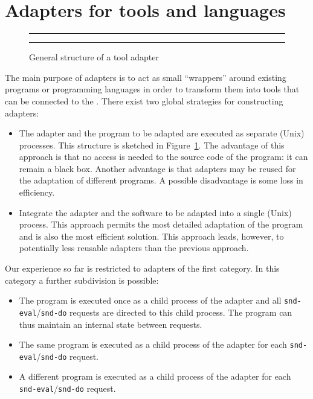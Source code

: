\documentclass[a4,twoside,noweb]{article} %
\begin{document}
\section{\label{Adapters}Adapters for tools and languages}
\begin{figure}[tb]
\rule{\textwidth}{0.5mm}
  
  \centerline{\box\graph}
  \caption{General structure of a tool adapter}
  \label{fig:adapter}
\rule{\textwidth}{0.5mm}
\end{figure}

The main purpose of adapters is to act as small ``wrappers'' around existing
programs or programming languages in order to transform them into tools that
can be connected to the \TB. There exist two global strategies for
constructing adapters:

\begin{itemize}
\item The adapter and the program to be adapted are executed as separate
(Unix) processes. This structure is sketched in Figure~\ref{fig:adapter}.
The advantage of this approach is that no access is
needed to the source code of the program: it can remain a black box.
Another advantage is that adapters may be reused for the adaptation of
different programs. A possible disadvantage is some loss in
efficiency.

\item Integrate the adapter and the software to be adapted into a single
(Unix) process. This approach permits the most detailed adaptation of
the program and is also the most efficient solution. This approach
leads, however, to potentially less reusable adapters than the
previous approach.

\end{itemize}

Our experience so far is restricted to adapters of the first category.
In this category a further subdivision is possible:
\begin{itemize}
\item The program is executed once as a child process of the adapter
and all {\tt snd-eval}/{\tt snd-do} requests are directed to this child process.
The program can thus maintain an internal state between requests.

\item The same program is executed as a child process of the adapter
for each {\tt snd-eval}/{\tt snd-do} request.

\item A different program is executed as a child process of the adapter
for each {\tt snd-eval}/{\tt snd-do} request.

\end{itemize}
\end{document}
